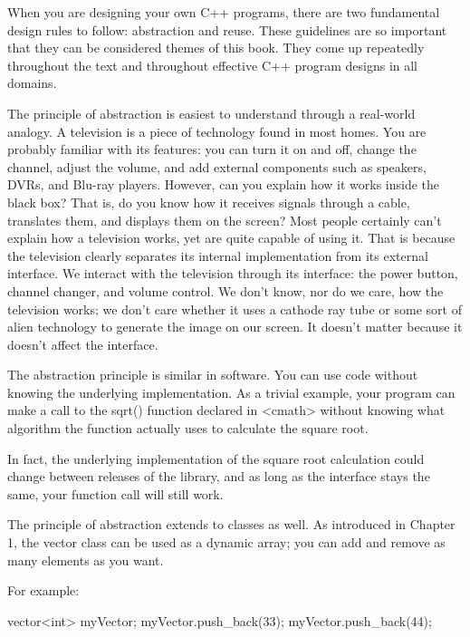 
When you are designing your own C++ programs, there are two fundamental design rules to follow: abstraction and reuse. These guidelines are so important that they can be considered themes of this book. They come up repeatedly throughout the text and throughout effective C++ program designs in all domains.


The principle of abstraction is easiest to understand through a real-world analogy. A television is a piece of technology found in most homes. You are probably familiar with its features: you can turn it on and off, change the channel, adjust the volume, and add external components such as speakers, DVRs, and Blu-ray players. However, can you explain how it works inside the black box? That is, do you know how it receives signals through a cable, translates them, and displays them on the screen? Most people certainly can’t explain how a television works, yet are quite capable of using it. That is because the television clearly separates its internal implementation from its external interface. We interact with the television through its interface: the power button, channel changer, and volume control. We don’t know, nor do we care, how the television works; we don’t care whether it uses a cathode ray tube or some sort of alien technology to generate the image on our screen. It doesn’t matter because it doesn’t affect the interface.


The abstraction principle is similar in software. You can use code without knowing the underlying implementation. As a trivial example, your program can make a call to the sqrt() function declared in <cmath> without knowing what algorithm the function actually uses to calculate the square root.

In fact, the underlying implementation of the square root calculation could change between releases of the library, and as long as the interface stays the same, your function call will still work.

The principle of abstraction extends to classes as well. As introduced in Chapter 1, the vector class can be used as a dynamic array; you can add and remove as many elements as you want.

For example:

\begin{cpp}
vector<int> myVector;
myVector.push_back(33);
myVector.push_back(44);
\end{cpp}

